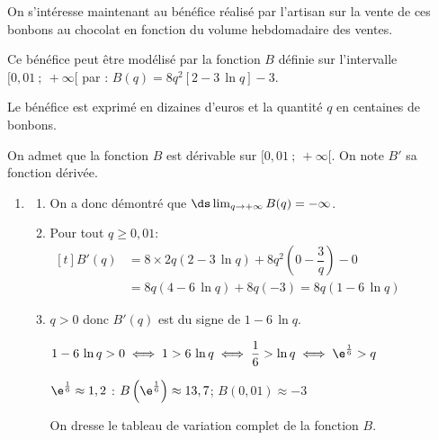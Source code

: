 On s'intéresse maintenant au bénéfice réalisé par l'artisan sur la vente de ces bonbons au chocolat en fonction du volume hebdomadaire des ventes.



Ce bénéfice peut être modélisé par la fonction $B$ définie sur l'intervalle $[0,01~;~+\infty[$ par :  $B(q) = 8q^2 [2 -3\,\ln q] - 3.$

Le bénéfice est exprimé en dizaines d'euros et la quantité $q$ en centaines de bonbons.

On admet que la fonction $B$ est dérivable sur $[0,01~;~+\infty[$. On note $B'$ sa fonction dérivée. 

\begin{enumerate}
\item 
	\begin{enumerate}
		\item
{}

On a donc démontré que $\ds\lim_{q \to +\infty} B(q)=-\infty$.

		\item Pour tout $q \geqslant 0,01$: 
$\begin{aligned}[t]
B'(q) 
& = 8\times 2q\left (2-3\,\ln q\right ) +8q^2\left (0 -\dfrac{3}{q}\right ) - 0\\
& = 8q\left (4 - 6\,\ln q\right ) + 8q\left (-3\right )
= 8q \left (1 - 6\,\ln q\right )
\end{aligned}$
		
		\item 
$q>0$ donc $B'(q)$ est du signe de $1- 6\,\ln q$.

$1- 6\,\ln q>0
\iff
1> 6\,\ln q
\iff
\dfrac{1}{6} > \ln q
\iff
\e^{\frac{1}{6}} > q$

$\e^{\frac{1}{6}} \approx 1,2$ : $B\left (\e^{\frac{1}{6}} \right ) \approx 13,7$;
$B(0,01) \approx -3$

On dresse le tableau de variation complet de la fonction $B$.


\end{enumerate}
\end{enumerate}
